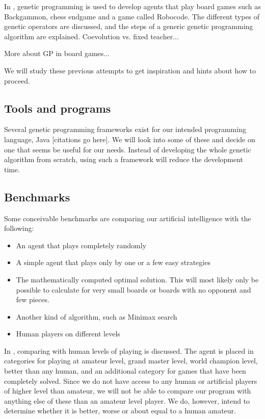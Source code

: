 \documentclass[times, 10pt,twocolumn]{article}
\begin{document}
In \cite{human-competitive_gp}, genetic programming is used to develop agents that play board games such as Backgammon, chess endgame and a game called Robocode. The different types of genetic operators are discussed, and the steps of a generic genetic programming algorithm are explained. Coevolution vs. fixed teacher...

More about GP in board games...

We will study these previous attempts to get inspiration and hints about how to proceed.

\subsection{Tools and programs}

Several genetic programming frameworks exist for our intended programming language, Java [citations go here]. We will look into some of these and decide on one that seems be useful for our needs. Instead of developing the whole genetic algorithm from scratch, using such a framework will reduce the development time.

\subsection{Benchmarks}

Some conceivable benchmarks are comparing our artificial intelligence with the following:
\begin{itemize}
	\item{An agent that plays completely randomly}
	\item{A simple agent that plays only by one or a few easy strategies}
	\item{The mathematically computed optimal solution. This will most likely only be possible to calculate for very small boards or boards with no opponent and few pieces.}
	\item{Another kind of algorithm, such as Minimax search}
	\item{Human players on different levels}
\end{itemize}

In \cite{games_solved}, comparing with human levels of playing is discussed.  The agent is placed in categories for playing at amateur level, grand master level, world champion level, better than any human, and an additional category for games that have been completely solved. Since we do not have access to any human or artificial players of higher level than amateur, we will not be able to compare our program with anything else of these than an amateur level player. We do, however, intend to determine whether it is better, worse or about equal to a human amateur.
\end{document}
